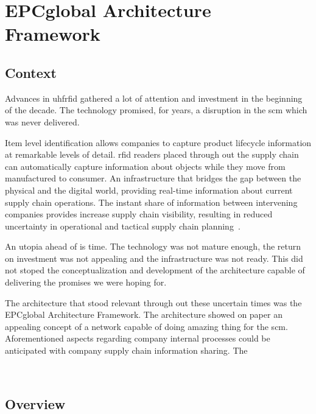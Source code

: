 \chapter{EPCglobal Architecture Framework}

\section{Context}

Advances in \ac{uhfrfid} gathered a lot of attention and investment in the beginning of the decade. The technology promised, for years, a disruption in the \ac{scm} which was never delivered.

Item level identification allows companies to capture product lifecycle information at remarkable levels of detail. \ac{rfid} readers placed through out the supply chain can automatically capture information about objects while they move from manufactured to consumer.
An infrastructure that bridges the gap between the physical and the digital world, providing real-time information about current supply chain operations. 
The instant share of information between intervening companies provides increase supply chain visibility, resulting in reduced uncertainty in operational and tactical supply chain planning~\cite{lorenzDiscoveryServicesEPC2011}.

An utopia ahead of is time. The technology was not mature enough, the return on investment was not appealing and the infrastructure was not ready.
This did not stoped the conceptualization and development of the architecture capable of delivering the promises we were hoping for.

The architecture that stood relevant through out these uncertain times was the EPCglobal Architecture Framework.
The architecture showed on paper an appealing concept of a network capable of doing amazing thing for the \ac{scm}.
Aforementioned aspects regarding company internal processes could be anticipated with company supply chain information sharing.
The

~\cite{simchi-leviCadeiasSuprimentosProjeto2003}


\section{Overview}


